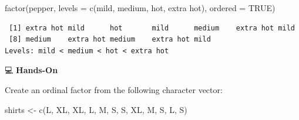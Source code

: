 \documentclass[
  letterpaper,
  DIV=11,
  numbers=noendperiod]{scrreprt}
\newenvironment{Shaded}{\begin{snugshade}}{\end{snugshade}}
\newcommand{\AttributeTok}[1]{\textcolor[rgb]{0.40,0.45,0.13}{#1}}
\newcommand{\ConstantTok}[1]{\textcolor[rgb]{0.56,0.35,0.01}{#1}}
\newcommand{\FunctionTok}[1]{\textcolor[rgb]{0.28,0.35,0.67}{#1}}
\newcommand{\NormalTok}[1]{\textcolor[rgb]{0.00,0.23,0.31}{#1}}
\newcommand{\OtherTok}[1]{\textcolor[rgb]{0.00,0.23,0.31}{#1}}
\newcommand{\StringTok}[1]{\textcolor[rgb]{0.13,0.47,0.30}{#1}}
\begin{document}
\begin{tcolorbox}[enhanced jigsaw, colbacktitle=quarto-callout-tip-color!10!white, opacitybacktitle=0.6, breakable, left=2mm, leftrule=.75mm, toprule=.15mm, toptitle=1mm, bottomtitle=1mm, colframe=quarto-callout-tip-color-frame, opacityback=0, coltitle=black, arc=.35mm, titlerule=0mm, colback=white, bottomrule=.15mm, title=\textcolor{quarto-callout-tip-color}{\faLightbulb}\hspace{0.5em}{Answer}, rightrule=.15mm]

\begin{Shaded}
\begin{Highlighting}[]
\FunctionTok{factor}\NormalTok{(pepper, }\AttributeTok{levels =} \FunctionTok{c}\NormalTok{(}\StringTok{\textquotesingle{}mild\textquotesingle{}}\NormalTok{, }\StringTok{\textquotesingle{}medium\textquotesingle{}}\NormalTok{, }\StringTok{\textquotesingle{}hot\textquotesingle{}}\NormalTok{, }\StringTok{\textquotesingle{}extra hot\textquotesingle{}}\NormalTok{), }\AttributeTok{ordered =} \ConstantTok{TRUE}\NormalTok{)}
\end{Highlighting}
\end{Shaded}

\begin{verbatim}
 [1] extra hot mild      hot       mild      medium    extra hot mild     
 [8] medium    extra hot medium    extra hot mild     
Levels: mild < medium < hot < extra hot
\end{verbatim}

\end{tcolorbox}

💻 \textbf{Hands-On}

Create an ordinal factor from the following character vector:

\begin{Shaded}
\begin{Highlighting}[]
\NormalTok{shirts }\OtherTok{\textless{}{-}} \FunctionTok{c}\NormalTok{(}\StringTok{\textquotesingle{}L\textquotesingle{}}\NormalTok{, }\StringTok{\textquotesingle{}XL\textquotesingle{}}\NormalTok{, }\StringTok{\textquotesingle{}XL\textquotesingle{}}\NormalTok{, }\StringTok{\textquotesingle{}L\textquotesingle{}}\NormalTok{, }\StringTok{\textquotesingle{}M\textquotesingle{}}\NormalTok{, }\StringTok{\textquotesingle{}S\textquotesingle{}}\NormalTok{, }\StringTok{\textquotesingle{}S\textquotesingle{}}\NormalTok{, }\StringTok{\textquotesingle{}XL\textquotesingle{}}\NormalTok{, }\StringTok{\textquotesingle{}M\textquotesingle{}}\NormalTok{, }\StringTok{\textquotesingle{}S\textquotesingle{}}\NormalTok{, }\StringTok{\textquotesingle{}L\textquotesingle{}}\NormalTok{, }\StringTok{\textquotesingle{}S\textquotesingle{}}\NormalTok{)}
\end{Highlighting}
\end{Shaded}
\end{document}
